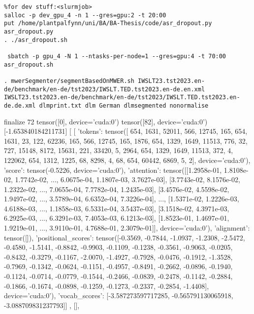 \begin{verbatim}
%for dev stuff:<slurmjob>
salloc -p dev_gpu_4 -n 1 --gres=gpu:2 -t 20:00
put /home/plantpalfynn/uni/BA/BA-Thesis/code/asr_dropout.py asr_dropout.py
. ./asr_dropout.sh

 sbatch -p gpu_4 -N 1 --ntasks-per-node=1 --gres=gpu:4 -t 70:00 asr_dropout.sh
 
. mwerSegmenter/segmentBasedOnMWER.sh IWSLT23.tst2023.en-de/benchmark/en-de/tst2023/IWSLT.TED.tst2023.en-de.en.xml IWSLT23.tst2023.en-de/benchmark/en-de/tst2023/IWSLT.TED.tst2023.en-de.de.xml dlmprint.txt dlm German dlmsegmented nonormalise
\end{verbatim}

finalize  72 tensor([0], device='cuda:0') tensor([82], device='cuda:0') [-1.653840184211731] [
    [   
        {'tokens': tensor([   654,   1631,  52011,    566,  12745,    165,    654,   1631,     23,
           122,  62236,    165,    566,  12745,    165,   1876,    654,   1329,
          1649,  11513,    776,     32,    727,  15148,   8172,  15631,    221,
         33420,      5,   2964,    654,   1329,   1649,  11513,    372,      4,
        122062,    654,   1312,   1225,     68,   8298,      4,     68,    654,
         60442,   6869,      5,      2], device='cuda:0'), 'score': tensor(-0.5226, device='cuda:0'), 'attention': tensor([[1.2958e-01, 1.8108e-02, 1.7742e-02,  ..., 6.0675e-04, 1.1807e-03,
         3.7627e-03],
        [3.7743e-02, 8.1576e-02, 1.2322e-02,  ..., 7.0655e-04, 7.7782e-04,
         1.2435e-03],
        [3.4576e-02, 4.5598e-02, 1.9497e-02,  ..., 3.5789e-04, 6.6352e-04,
         7.3226e-04],
        ...,
        [1.5371e-02, 1.2226e-03, 4.6188e-03,  ..., 1.1858e-03, 6.5331e-04,
         3.5437e-03],
        [3.1518e-02, 4.3971e-03, 6.2925e-03,  ..., 6.3291e-03, 7.4053e-03,
         6.1213e-03],
        [1.8523e-01, 1.4697e-01, 1.9219e-01,  ..., 3.9110e-01, 4.7688e-01,
         2.3079e-01]], device='cuda:0'), 'alignment': tensor([]), 'positional_scores': tensor([-0.3569, -0.7844, -1.0937, -1.2308, -2.5472, -0.4580, -1.5141, -0.8842,
        -0.9903, -0.1109, -0.1238, -0.3561, -0.9063, -0.0205, -0.8432, -0.3279,
        -0.1167, -2.0070, -1.4927, -0.7928, -0.0476, -0.1912, -1.3528, -0.7969,
        -0.1342, -0.0624, -0.1151, -0.4957, -0.8491, -0.2662, -0.0896, -0.1940,
        -0.1124, -0.0714, -0.0779, -0.1544, -0.2466, -0.0839, -0.2478, -0.1142,
        -0.2884, -0.1866, -0.1674, -0.0898, -0.1259, -0.1273, -0.2337, -0.2854,
        -1.4408], device='cuda:0'), 'vocab_scores': [-3.587273597717285, -0.565791130065918, -3.088709831237793]}]
        ,
        [], 
